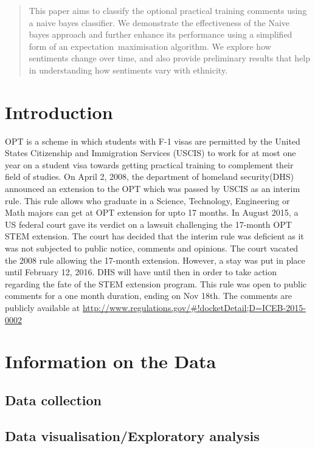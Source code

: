 \documentclass{sig-alternate-05-2015}
\begin{document}
\maketitle
\begin{abstract}
This paper aims to classify the optional practical training comments using a naive bayes classifier. We demonstrate the effectiveness of the Naive bayes approach and further enhance its performance using a simplified form  of an expectation\
maximisation algorithm. We explore how sentiments change over time, and also provide preliminary results that help in understanding how sentiments vary with ethnicity.
\end{abstract}

\section{Introduction}
OPT is a scheme in which students with F-1 visas are permitted by the United States Citizenship and Immigration Services (USCIS) to work for at most one year on a student visa towards getting practical training to complement their field of studies. On April 2, 2008, the department of homeland security(DHS) announced an extension to the OPT which was passed by USCIS as an interim rule. This rule allows who graduate in a Science, Technology, Engineering or Math majors can get at OPT extension for upto 17 months. 
In August 2015, a US federal court gave its verdict on a lawsuit challenging the 17-month OPT STEM extension. The court has decided that the interim rule was deficient as it was not subjected to public notice, comments and opinions. The court vacated the 2008 rule allowing the 17-month extension. However, a stay was put in place until February 12, 2016. DHS will have until then in order to take action regarding the fate of the STEM extension program. This rule was open to public comments for a one month duration, ending on Nov 18th. The comments are publicly available at \url{http://www.regulations.gov/#!docketDetail;D=ICEB-2015-0002}

\section{Information on the Data}
\subsection{Data collection}

\subsection{Data visualisation/Exploratory analysis}
\end{document}
